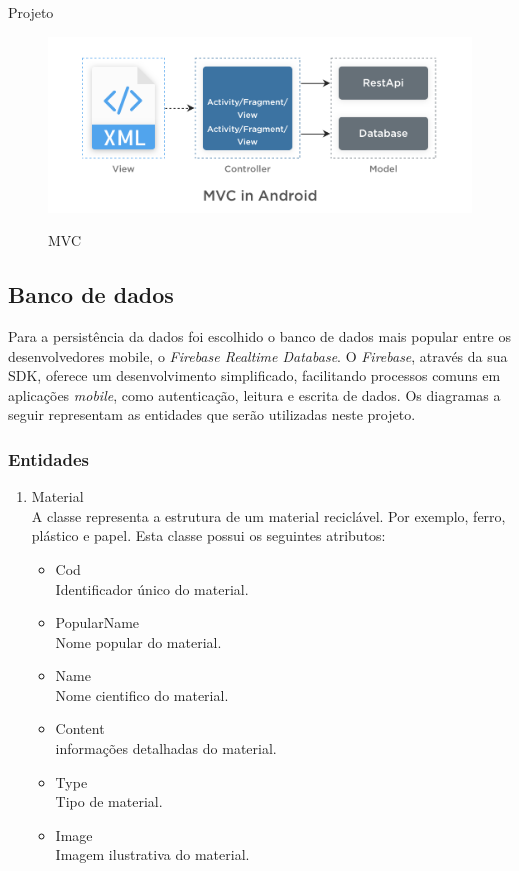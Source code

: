\documentclass[
	12pt,				%
	openany,			%
	twoside,			%
	a4paper,			%
	english,			%
	french,				%
	spanish,			%
	brazil				%
	]{abntex2}
\begin{document}
\begin{chapter}{Projeto}
\begin{figure}[h]
\centering
   \caption{MVC}
   \includegraphics[scale=0.40]{media/MVC.png}
     \label{fig:arquitetura_mvc}
\end{figure}


\subsection{Banco de dados}
Para a persistência da dados foi escolhido o banco de dados mais popular entre os desenvolvedores mobile, o \textit{Firebase Realtime Database}. O \textit{Firebase}, através da sua SDK, oferece um desenvolvimento simplificado, facilitando processos comuns em aplicações \textit{mobile}, como autenticação, leitura e escrita de dados.
 Os diagramas a seguir representam as entidades que serão utilizadas neste projeto.


\subsubsection{Entidades}
\begin{enumerate}
 \item{Material} \\ A classe \textit{} representa a estrutura de um material reciclável. Por exemplo, ferro, plástico e papel. Esta classe possui os seguintes atributos:
 
 \begin{itemize}
  \item{Cod}\\ Identificador único do material.
   \item{PopularName}\\ Nome popular do material.
     \item{Name}\\ Nome cientifico do material.
       \item{Content}\\ informações detalhadas do material.
         \item{Type}\\ Tipo de material.
           \item{Image}\\ Imagem ilustrativa do material.
\end{itemize}
  

\end{enumerate}
\end{chapter}
\end{document}
